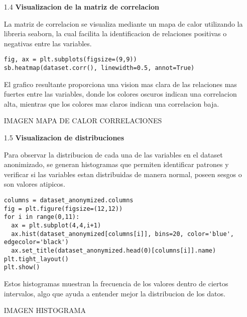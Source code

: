 \documentclass{article}
\begin{document}
\bigskip

\begin{itemize}

\item[1.4]  {\bf Visualizacion de la matriz de correlacion}

La matriz de correlacion se visualiza mediante un mapa de calor utilizando la libreria seaborn, la cual facilita la identificacion de relaciones positivas o negativas entre las variables.

\begin{tcolorbox}[width=14cm]
\begin{scriptsize}
\begin{verbatim}
fig, ax = plt.subplots(figsize=(9,9))
sb.heatmap(dataset.corr(), linewidth=0.5, annot=True)
\end{verbatim}
\end{scriptsize}
\end{tcolorbox}

El grafico resultante proporciona una vision mas clara de las relaciones mas fuertes entre las variables, donde los colores oscuros indican una correlacion alta, mientras que los colores mas claros indican una correlacion baja.

IMAGEN MAPA DE CALOR CORRELACIONES

\end{itemize}

\bigskip

\begin{itemize}

\item[1.5]  {\bf Visualizacion de distribuciones}

Para observar la distribucion de cada una de las variables en el dataset anonimizado, se generan histogramas que permiten identificar patrones y verificar si las variables estan distribuidas de manera normal, poseen sesgos o son valores atipicos.

\begin{tcolorbox}[width=14cm]
\begin{scriptsize}
\begin{verbatim}
columns = dataset_anonymized.columns
fig = plt.figure(figsize=(12,12))
for i in range(0,11):
  ax = plt.subplot(4,4,i+1)
  ax.hist(dataset_anonymized[columns[i]], bins=20, color='blue', edgecolor='black')
  ax.set_title(dataset_anonymized.head(0)[columns[i]].name)
plt.tight_layout()
plt.show()
\end{verbatim}
\end{scriptsize}
\end{tcolorbox}

Estos histogramas muestran la frecuencia de los valores dentro de ciertos intervalos, algo que ayuda a entender mejor la distribucion de los datos.

IMAGEN HISTOGRAMA

\end{itemize}
\end{document}
